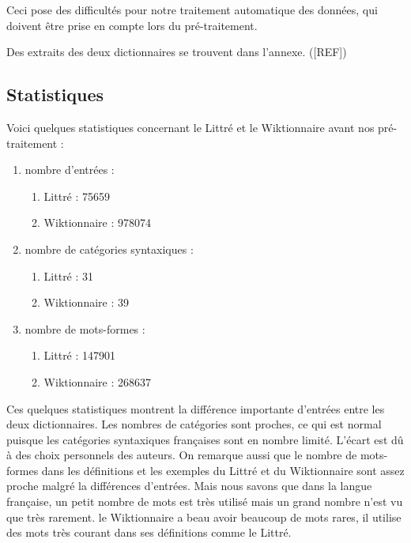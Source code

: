 Ceci pose des difficultés pour notre traitement automatique des données, qui 
doivent être prise en compte lors du pré-traitement.

Des extraits des deux dictionnaires se trouvent dans l'annexe. ([REF])

\subsection{Statistiques}

Voici quelques statistiques concernant le Littré et le Wiktionnaire avant nos 
pré-traitement :

\begin{enumerate}
 \item {nombre d'entrées :
	\begin{enumerate}
	 \item Littré : 75659
	 \item Wiktionnaire : 978074
	\end{enumerate}
	}
 \item {nombre de catégories syntaxiques :
	\begin{enumerate}
	 \item Littré : 31
	 \item Wiktionnaire : 39
	\end{enumerate}
	}
 \item {nombre de mots-formes :
	\begin{enumerate}
	 \item Littré : 147901
	 \item Wiktionnaire : 268637
	\end{enumerate}
	}
\end{enumerate}

Ces quelques statistiques montrent la différence importante d'entrées entre les 
deux dictionnaires. Les nombres de catégories sont proches, ce qui est normal 
puisque les catégories syntaxiques françaises sont en nombre limité. L'écart 
est dû à des choix personnels des auteurs. On remarque aussi que le nombre de 
mots-formes dans les définitions et les exemples du Littré et du Wiktionnaire 
sont assez proche malgré la différences d'entrées. Mais nous savons que dans la 
langue française, un petit nombre de mots est très utilisé mais un grand nombre 
n'est vu que très rarement. le Wiktionnaire a beau avoir beaucoup de mots  
rares, il utilise des mots très courant dans ses définitions comme le Littré.
